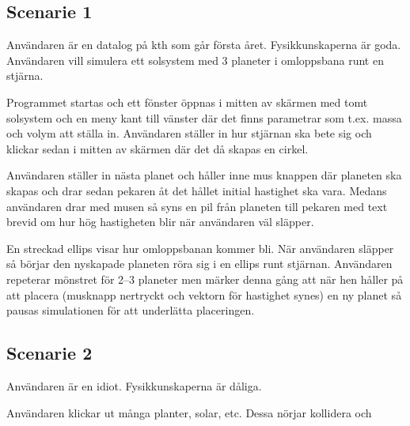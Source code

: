 
\subsection{Scenarie 1}

Användaren är en datalog på kth som går första året.
Fysikkunskaperna är goda.
Användaren vill simulera ett solsystem med 3 planeter
i omloppsbana runt en stjärna.

Programmet startas och ett fönster öppnas i mitten av skärmen
med tomt solsystem och en meny kant till vänster där det finns
parametrar som t.ex. massa och volym att ställa in.
Användaren ställer in hur stjärnan ska bete sig och klickar
sedan i mitten av skärmen där det då skapas en cirkel.

Användaren ställer in nästa planet och håller inne mus knappen där
planeten ska skapas och drar sedan pekaren åt det hållet initial
hastighet ska vara.
Medans användaren drar med musen så syns en pil från planeten till
pekaren med text brevid om hur hög hastigheten blir när användaren väl släpper.

En streckad ellips visar hur omloppsbanan kommer bli.
När användaren släpper så börjar den nyskapade planeten röra sig
i en ellips runt stjärnan.
Användaren repeterar mönstret för 2--3 planeter men märker denna gång
att när hen håller på att placera (musknapp nertryckt och vektorn
för hastighet synes) en ny planet så pausas simulationen för att
underlätta placeringen.

\subsection{Scenarie 2}

Användaren är en idiot.
Fysikkunskaperna är dåliga.

Användaren klickar ut många planter, solar, etc.
Dessa nörjar kollidera och  %
